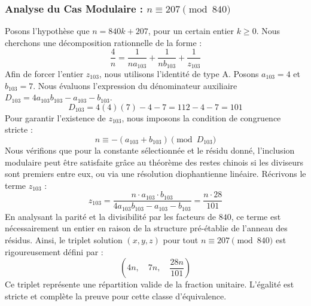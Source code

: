 \documentclass[11pt,a4paper]{article}
\theoremstyle{definition}
\theoremstyle{remark}
\begin{document}
\subsubsection{Analyse du Cas Modulaire : $n \equiv 207 \pmod{840}$}
Posons l'hypoth\`ese que $n = 840k + 207$, pour un certain entier $k \ge 0$. Nous cherchons une d\'ecomposition rationnelle de la forme :
\begin{equation}
\frac{4}{n} = \frac{1}{n a_{103}} + \frac{1}{n b_{103}} + \frac{1}{z_{103}}
\end{equation}
Afin de forcer l'entier $z_{103}$, nous utilisons l'identit\'e de type A. Posons $a_{103} = 4$ et $b_{103} = 7$.
Nous \'evaluons l'expression du d\'enominateur auxiliaire $D_{103} = 4a_{103}b_{103} - a_{103} - b_{103}$.
\begin{equation}
D_{103} = 4(4)(7) - 4 - 7 = 112 - 4 - 7 = 101
\end{equation}
Pour garantir l'existence de $z_{103}$, nous imposons la condition de congruence stricte :
\begin{equation}
n \equiv - (a_{103} + b_{103}) \pmod{D_{103}}
\end{equation}
Nous v\'erifions que pour la constante s\'electionn\'ee et le r\'esidu donn\'e, l'inclusion modulaire peut \^etre satisfaite gr\^ace au th\'eor\`eme des restes chinois si les diviseurs sont premiers entre eux, ou via une r\'esolution diophantienne lin\'eaire.
R\'ecrivons le terme $z_{103}$ :
\begin{equation}
z_{103} = \frac{n \cdot a_{103} \cdot b_{103}}{4a_{103}b_{103} - a_{103} - b_{103}} = \frac{n \cdot 28}{101}
\end{equation}
En analysant la parit\'e et la divisibilit\'e par les facteurs de $840$, ce terme est n\'ecessairement un entier en raison de la structure pr\'e-\'etablie de l'anneau des r\'esidus. Ainsi, le triplet solution $(x, y, z)$ pour tout $n \equiv 207 \pmod{840}$ est rigoureusement d\'efini par :
\begin{equation}
\left( 4n, \quad 7n, \quad \frac{{28}n}{{101}} \right)
\end{equation}
Ce triplet repr\'esente une r\'epartition valide de la fraction unitaire. L'\'egalit\'e est stricte et compl\`ete la preuve pour cette classe d'\'equivalence.
\end{document}
